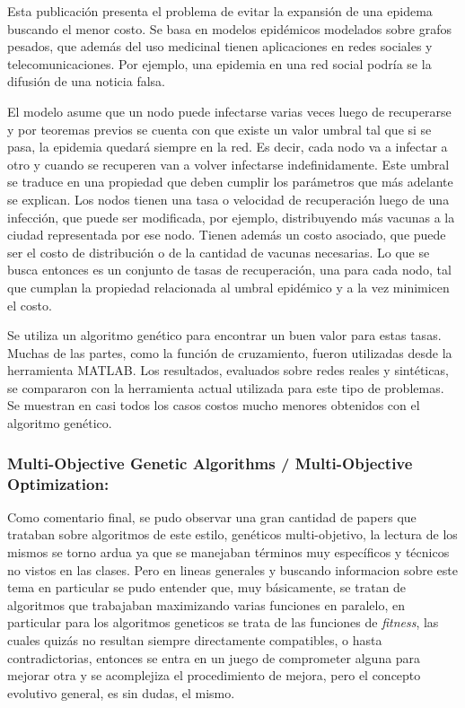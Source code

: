 Esta publicación presenta el problema de evitar la expansión de una epidema buscando el menor costo. Se basa en modelos
 epidémicos modelados sobre grafos pesados, que además del uso medicinal tienen aplicaciones en redes sociales y
 telecomunicaciones. Por ejemplo, una epidemia en una red social podría se la difusión de una noticia falsa.


El modelo asume que un nodo puede infectarse varias veces luego de recuperarse y por teoremas previos se cuenta con
que existe un valor umbral tal que si se pasa, la epidemia quedará siempre en la red. Es decir, cada nodo va a infectar
 a otro y cuando se recuperen van a volver infectarse indefinidamente. Este umbral se traduce en una propiedad que
 deben cumplir los parámetros que más adelante se explican.
Los nodos tienen una tasa o velocidad de recuperación luego de una infección, que puede ser modificada, por ejemplo,
distribuyendo más vacunas a la ciudad representada por ese nodo. Tienen además un costo asociado, que puede ser el costo
 de distribución o de la cantidad de vacunas necesarias. Lo que se busca entonces es un conjunto de tasas de recuperación,
 una para cada nodo, tal que cumplan la propiedad relacionada al umbral epidémico y a la vez minimicen el costo.


Se utiliza un algoritmo genético para encontrar un buen valor para estas tasas. Muchas de las partes, como la función de
cruzamiento, fueron utilizadas desde la herramienta MATLAB.
Los resultados, evaluados sobre redes reales y sintéticas, se compararon con la herramienta actual utilizada para este
tipo de problemas. Se muestran en casi todos los casos costos mucho menores obtenidos con el algoritmo genético.

\subsubsection*{Multi-Objective Genetic Algorithms / Multi-Objective Optimization:}

Como comentario final, se pudo observar una gran cantidad de papers que trataban sobre algoritmos de este estilo, genéticos
multi-objetivo, la lectura de los mismos se torno ardua ya que se manejaban términos muy específicos y técnicos no vistos
en las clases. Pero en lineas generales y buscando informacion\cite{MOO} sobre este tema en particular se pudo entender
que, muy básicamente, se tratan de algoritmos que trabajaban maximizando varias funciones en paralelo, en particular
para los algoritmos geneticos se trata de las funciones de \emph{fitness}, las cuales quizás no resultan siempre
directamente compatibles, o hasta contradictorias, entonces se entra en un juego de comprometer alguna
para mejorar otra y se acomplejiza el procedimiento de mejora, pero el concepto evolutivo general, es sin dudas, el mismo.
